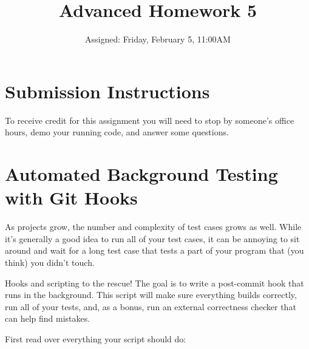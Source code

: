 \documentclass{article}
\begin{document}
\fancyfoot[C]{\color{gray} \thepage~/~\pageref*{LastPage}}
\pagestyle{fancyplain}


\title{\textbf{Advanced Homework 5\\}}
\author{Assigned: Friday, February 5, 11:00AM}
\date{\textbf{\color{red}{Due: Before the first lecture on Friday, February 19}}}
\maketitle


\section*{Submission Instructions}
To receive credit for this assignment you will need to stop by someone's
office hours, demo your running code, and answer some questions.

\section{Automated Background Testing with Git Hooks}

As projects grow, the number and complexity of test cases grows as well. While
it's generally a good idea to run all of your test cases, it can be annoying
to sit around and wait for a long test case that tests a part of your program
that (you think) you didn't touch.

\medskip
\noindent
Hooks and scripting to the rescue! The goal is to write a post-commit hook
that runs in the background. This script will make sure everything builds
correctly, run all of your tests, and, as a bonus, run an external correctness
checker that can help find mistakes.

\medskip
\noindent
First read over everything your script should do:
\end{document}
